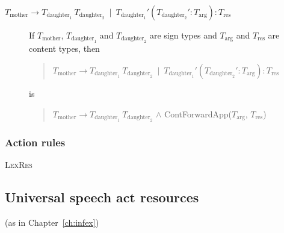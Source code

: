 \begin{description}
\begin{quote}
\end{quote}

\item[\textnormal{$T_{\text{mother}}\longrightarrow
    T_{\text{daughter}_1}\ T_{\text{daughter}_2}\ \mid\
    T_{\text{daughter}_1}'(T_{\text{daughter}_2}':T_{\text{arg}}):T_{\text{res}}$}]
  \mbox{}

  If $T_{\text{mother}}$, $T_{\text{daughter}_1}$ and
  $T_{\text{daughter}_2}$ are sign types and $T_{\text{arg}}$ and
  $T_{\text{res}}$ are content types, then
  \begin{quote}
    $T_{\text{mother}}\longrightarrow
    T_{\text{daughter}_1}\ T_{\text{daughter}_2}\ \mid\
    T_{\text{daughter}_1}'(T_{\text{daughter}_2}':T_{\text{arg}}):T_{\text{res}}$
  \end{quote}
  is
  \begin{quote}
  $T_{\text{mother}}\longrightarrow
    T_{\text{daughter}_1}\ T_{\text{daughter}_2}$ \d{\d{$\wedge$}}
    ContForwardApp($T_{\text{arg}}$, $T_{\text{res}}$)
  \end{quote}

  


  
  

\end{description}


\subsubsection{Action rules}

\begin{description}

  




\item[\textnormal{\textsc{LexRes}}] \mbox{}

  \begin{prooftree}
    \hypo{u:_A T}
  \end{prooftree}


  \end{description}



\subsection{Universal speech act resources} (as in Chapter~\ref{ch:infex})

